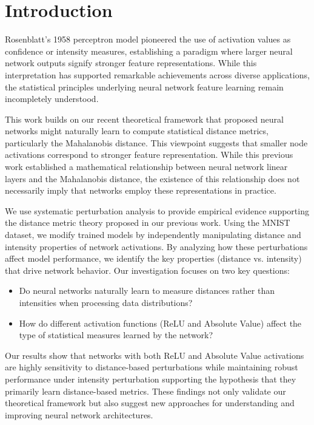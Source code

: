 \section{Introduction}

Rosenblatt's 1958 perceptron model pioneered the use of activation values as confidence or intensity measures, establishing a paradigm where larger neural network outputs signify stronger feature representations. While this interpretation has supported remarkable achievements across diverse applications, the statistical principles underlying neural network feature learning remain incompletely understood.

This work builds on our recent theoretical framework \cite{oursland2024interpreting} that proposed neural networks might naturally learn to compute statistical distance metrics, particularly the Mahalanobis distance. This viewpoint suggests that smaller node activations correspond to stronger feature representation. While this previous work established a mathematical relationship between neural network linear layers and the Mahalanobis distance, the existence of this relationship does not necessarily imply that networks employ these representations in practice. 

We use systematic perturbation analysis to provide empirical evidence supporting the distance metric theory proposed in our previous work. Using the MNIST dataset, we modify trained models by independently manipulating distance and intensity properties of network activations. By analyzing how these perturbations affect model performance, we identify the key properties (distance vs. intensity) that drive network behavior. Our investigation focuses on two key questions:

\begin{itemize}
    \item Do neural networks naturally learn to measure distances rather than intensities when processing data distributions?
    \item How do different activation functions (ReLU and Absolute Value) affect the type of statistical measures learned by the network?
\end{itemize}

Our results show that networks with both ReLU and Absolute Value activations are highly sensitivity to distance-based perturbations while maintaining robust performance under intensity perturbation supporting the hypothesis that they primarily learn distance-based metrics. These findings not only validate our theoretical framework but also suggest new approaches for understanding and improving neural network architectures.